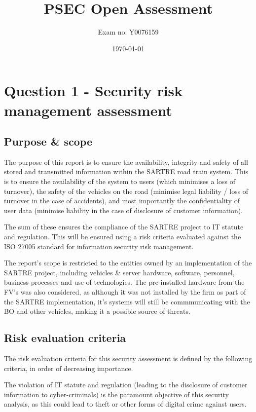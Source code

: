 \documentclass[british,11pt,a4paper]{article}
\begin{document}
\title{PSEC Open Assessment}
\author{Exam no: Y0076159}
\date{\today}
\maketitle
\tableofcontents
\clearpage
\listoffigures
\listoftables
\clearpage

\section{Question 1 - Security risk management assessment}
\subsection{Purpose \& scope}
\label{subsec:purpose_scope}
The purpose of this report is to ensure the availability, integrity and safety of all stored and transmitted information within the SARTRE road train system. This is to ensure the availability of the system to users (which minimises a loss of turnover), the safety of the vehicles on the road (minimise legal liability / loss of turnover in the case of accidents), and most importantly the confidentiality of user data (minimise liability in the case of disclosure of customer information).

The sum of these ensures the compliance of the SARTRE project to IT statute and regulation. This will be ensured using a risk criteria evaluated against the ISO 27005  standard \cite{Iso2005-nn} for information security risk management. 

The report's scope is restricted to the entities owned by an implementation of the SARTRE project, including vehicles \& server hardware, software, personnel, business processes and use of technologies. The pre-installed hardware from the FV's was also considered, as although it was not installed by the firm as part of the SARTRE implementation, it's systems will still be commmunicating with the BO and other vehicles, making it a possible source of threats.

\subsection{Risk evaluation criteria}
The risk evaluation criteria for this security assessment is defined by the following criteria, in order of decreasing importance.

The violation of IT statute and regulation (leading to the disclosure of customer information to cyber-criminals) is the paramount objective of this security analysis, as this could lead to theft or other forms of digital crime against users. 
\end{document}
